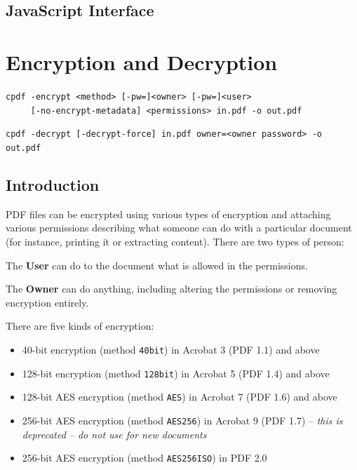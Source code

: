 \documentclass{book}
\begin{document}
\begin{jscpdflib}
\clearpage
\section*{JavaScript Interface}
\begin{small}\tt

\end{small}
\end{jscpdflib}

\chapter{Encryption and Decryption}\label{chap:4}
\pagestyle{fancy}
\label{encryption}

  \begin{framed}
    \small\noindent\verb!cpdf -encrypt <method> [-pw=]<owner> [-pw=]<user>!\\
    \noindent\verb!     [-no-encrypt-metadata] <permissions> in.pdf -o out.pdf!

    \vspace{1.5mm}
    \noindent\verb!cpdf -decrypt [-decrypt-force] in.pdf owner=<owner password> -o out.pdf!
  \end{framed}

  \label{crypt}
  \section{Introduction}
  PDF files can be encrypted using various types of encryption and attaching
various permissions describing what someone can do with a particular document
(for instance, printing it or extracting content). There are two types of
person:
  \begin{description}
    \item The \textbf{User} can do to the document what is allowed in the permissions.
    \item The \textbf{Owner} can do anything, including altering the permissions or removing encryption entirely.
  \end{description}
  There are five kinds of encryption:
  \begin{itemize}
  \item 40-bit encryption (method \texttt{40bit}) in Acrobat 3 (PDF 1.1) and above
  \item 128-bit encryption (method \texttt{128bit}) in Acrobat 5 (PDF 1.4) and above
  \item 128-bit AES encryption (method \texttt{AES}) in Acrobat 7 (PDF 1.6) and above
  \item 256-bit AES encryption (method \texttt{AES256}) in Acrobat 9 (PDF 1.7) -- \textit{this is deprecated -- do not use for new documents}
  \item 256-bit AES encryption (method \texttt{AES256ISO}) in PDF 2.0
  \end{itemize}
\end{document}
